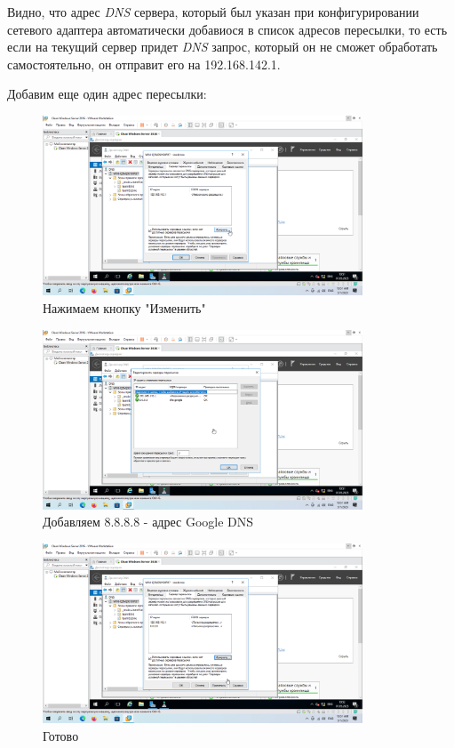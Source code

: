 \documentclass[a4paper]{article}
\begin{document}
  Видно, что адрес \textit{DNS} сервера, который был указан при конфигурировании
  сетевого адаптера автоматически добавиося в список адресов пересылки, то есть
  если на текущий сервер придет \textit{DNS} запрос, который он не сможет
  обработать самостоятельно, он отправит его на 192.168.142.1.

  Добавим еще один адрес пересылки:

  \begin{figure}[H]
    \centering
    \includegraphics[width=0.85\textwidth]{9_0095}
    \caption{Нажимаем кнопку "Изменить"}
    \label{img:0095}
  \end{figure}

  \begin{figure}[H]
    \centering
    \includegraphics[width=0.85\textwidth]{9_0096}
    \caption{Добавляем 8.8.8.8 - адрес Google DNS}
    \label{img:0096}
  \end{figure}

  \begin{figure}[H]
    \centering
    \includegraphics[width=0.85\textwidth]{9_0098}
    \caption{Готово}
    \label{img:0098}
  \end{figure}
\end{document}
